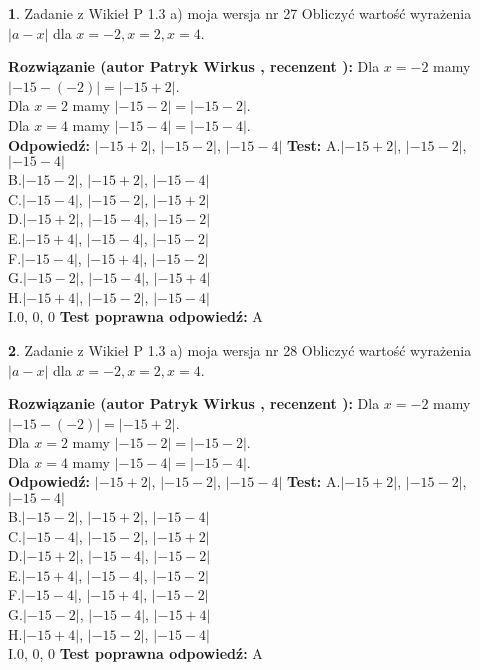 \documentclass[12pt, a4paper]{article}
\theoremstyle{definition} %
\newtheorem{zad}{}
\newcommand{\zadStart}[1]{\begin{zad}#1\newline}
\newcommand{\zadStop}{\end{zad}}
\newcommand{\rozwStart}[2]{\noindent \textbf{Rozwiązanie (autor #1 , recenzent #2): }\newline}
\newcommand{\rozwStop}{\newline}
\newcommand{\odpStart}{\noindent \textbf{Odpowiedź:}\newline}
\newcommand{\odpStop}{\newline}
\newcommand{\testStart}{\noindent \textbf{Test:}\newline}
\newcommand{\testStop}{\newline}
\newcommand{\kluczStart}{\noindent \textbf{Test poprawna odpowiedź:}\newline}
\newcommand{\kluczStop}{\newline}
\begin{document}
\zadStart{Zadanie z Wikieł P 1.3 a) moja wersja nr 27}
Obliczyć wartość wyrażenia $|a - x|$ dla $x=-2,x=2,x=4$.
\zadStop
\rozwStart{Patryk Wirkus}{}
Dla $x = -2$ mamy $|-15 - (-2)| = |-15 + 2|$.\\
Dla $x = 2$ mamy $|-15 - 2| = |-15 - 2|$.\\
Dla $x = 4$ mamy $|-15 - 4| = |-15 - 4|$.\\
\rozwStop
\odpStart
$|-15 + 2|$, $|-15 - 2|$, $|-15 - 4|$
\odpStop
\testStart
A.$|-15 + 2|$, $|-15 - 2|$, $|-15 - 4|$\\
B.$|-15 - 2|$, $|-15 + 2|$, $|-15 - 4|$\\
C.$|-15 - 4|$, $|-15 - 2|$, $|-15 + 2|$\\
D.$|-15 + 2|$, $|-15 - 4|$, $|-15 - 2|$\\
E.$|-15 + 4|$, $|-15 - 4|$, $|-15 - 2|$\\
F.$|-15 - 4|$, $|-15 + 4|$, $|-15 - 2|$\\
G.$|-15 - 2|$, $|-15 - 4|$, $|-15 + 4|$\\
H.$|-15 + 4|$, $|-15 - 2|$, $|-15 - 4|$\\
I.$0$, $0$, $0$
\testStop
\kluczStart
A
\kluczStop



\zadStart{Zadanie z Wikieł P 1.3 a) moja wersja nr 28}
Obliczyć wartość wyrażenia $|a - x|$ dla $x=-2,x=2,x=4$.
\zadStop
\rozwStart{Patryk Wirkus}{}
Dla $x = -2$ mamy $|-15 - (-2)| = |-15 + 2|$.\\
Dla $x = 2$ mamy $|-15 - 2| = |-15 - 2|$.\\
Dla $x = 4$ mamy $|-15 - 4| = |-15 - 4|$.\\
\rozwStop
\odpStart
$|-15 + 2|$, $|-15 - 2|$, $|-15 - 4|$
\odpStop
\testStart
A.$|-15 + 2|$, $|-15 - 2|$, $|-15 - 4|$\\
B.$|-15 - 2|$, $|-15 + 2|$, $|-15 - 4|$\\
C.$|-15 - 4|$, $|-15 - 2|$, $|-15 + 2|$\\
D.$|-15 + 2|$, $|-15 - 4|$, $|-15 - 2|$\\
E.$|-15 + 4|$, $|-15 - 4|$, $|-15 - 2|$\\
F.$|-15 - 4|$, $|-15 + 4|$, $|-15 - 2|$\\
G.$|-15 - 2|$, $|-15 - 4|$, $|-15 + 4|$\\
H.$|-15 + 4|$, $|-15 - 2|$, $|-15 - 4|$\\
I.$0$, $0$, $0$
\testStop
\kluczStart
A
\kluczStop
\end{document}
